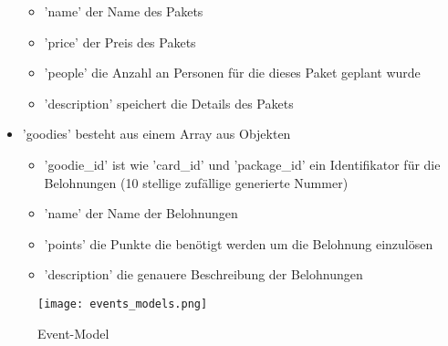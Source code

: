 \begin{itemize}
\begin{itemize}
						\item 'name' der Name des Pakets
						\item 'price' der Preis des Pakets
						\item 'people' die Anzahl an Personen für die dieses Paket geplant wurde
						\item 'description' speichert die Details des Pakets
					\end{itemize}
					\item 'goodies' besteht aus einem Array aus Objekten
					\begin{itemize}
						\item 'goodie\_id' ist wie 'card\_id' und 'package\_id' ein Identifikator für die Belohnungen (10 stellige zufällige generierte Nummer)
						\item 'name' der Name der Belohnungen
						\item 'points' die Punkte die benötigt werden um die Belohnung einzulösen
						\item 'description' die genauere Beschreibung der Belohnungen
					\end{itemize}				
				\end{itemize}
			
			\begin{figure}[h]
				\centering
				\texttt{[image: events\_models.png]}
				\caption{Event-Model}
			\end{figure}	
			
			\newpage		
				
